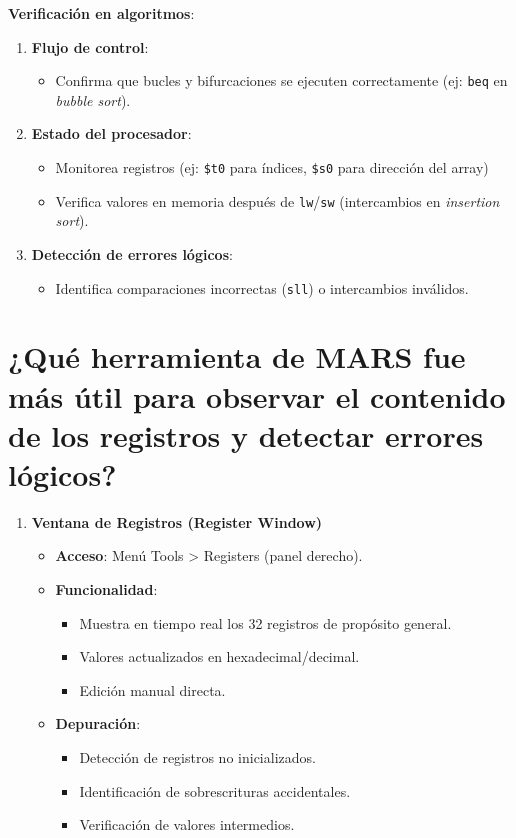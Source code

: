 \documentclass{article}
\begin{document}
\begin{itemize}
\begin{itemize}[label=--]
\textbf{Verificación en algoritmos}:
\begin{enumerate}
  \item \textbf{Flujo de control}:
    \begin{itemize}
      \item Confirma que bucles y bifurcaciones se ejecuten correctamente (ej: \texttt{beq} en \textit{bubble sort}).
    \end{itemize}
  \item \textbf{Estado del procesador}:
    \begin{itemize}
      \item Monitorea registros (ej: \texttt{\$t0} para índices, \texttt{\$s0} para dirección del array)
      \item Verifica valores en memoria después de \texttt{lw}/\texttt{sw} (intercambios en \textit{insertion sort}).
    \end{itemize}
  \item \textbf{Detección de errores lógicos}:
    \begin{itemize}
      \item Identifica comparaciones incorrectas (\texttt{sll}) o intercambios inválidos.
    \end{itemize}
\end{enumerate}

\section{¿Qué herramienta de MARS fue más útil para observar el contenido de los registros y detectar errores lógicos?}

\begin{enumerate}[leftmargin=*]
    \item \textbf{Ventana de Registros (Register Window)}
    \begin{itemize}
        \item \textbf{Acceso}: Menú Tools > Registers (panel derecho).
        \item \textbf{Funcionalidad}:
        \begin{itemize}
            \item Muestra en tiempo real los 32 registros de propósito general.
            \item Valores actualizados en hexadecimal/decimal.
            \item Edición manual directa.
        \end{itemize}
        \item \textbf{Depuración}:
        \begin{itemize}
            \item Detección de registros no inicializados.
            \item Identificación de sobrescrituras accidentales.
            \item Verificación de valores intermedios.
        \end{itemize}
    \end{itemize}


\end{enumerate}
\end{itemize}
\end{itemize}
\end{document}
